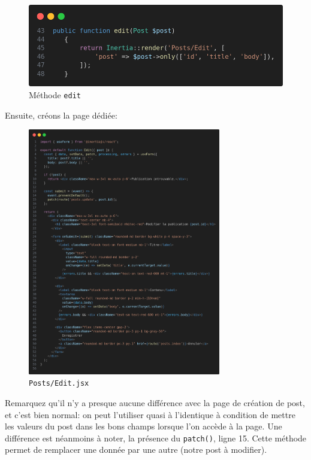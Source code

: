\begin{figure}[!h]
    \centering
    \includegraphics[width=0.8\linewidth]{figures-C1/postscontroller_edit.png}
    \caption{Méthode \texttt{edit}}
    \label{fig:posts-methode-edit}
\end{figure}
\newpage
Ensuite, créons la page dédiée:
\begin{figure}[!h]
    \centering
    \includegraphics[width=0.75\textwidth]{figures-C1/posts_edit.png}
    \caption{\texttt{Posts/Edit.jsx}}
\end{figure}

Remarquez qu'il n'y a presque aucune différence avec la page de création de post, et c'est bien normal: on peut l'utiliser quasi à l'identique à condition de mettre les valeurs du post dans les bons champs lorsque l'on accède à la page. Une différence est néanmoins à noter, la présence du \verb|patch()|, ligne 15. Cette méthode permet de remplacer une donnée par une autre (notre post à modifier).

\label{sec:posts_update}


